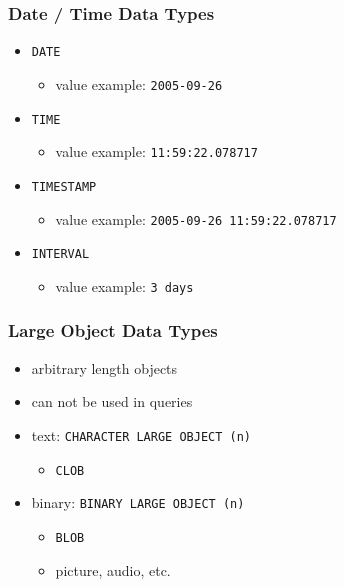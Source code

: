 \documentclass[dvipsnames]{beamer}
\theoremstyle{plain}
\begin{document}
\begin{frame}
  \frametitle{Date / Time Data Types}

  \begin{itemize}
    \item \texttt{DATE}
    \begin{itemize}
      \item value example: \texttt{2005-09-26}
    \end{itemize}

    \pause
    \medskip
    \item \texttt{TIME}
    \begin{itemize}
      \item value example: \texttt{11:59:22.078717}
    \end{itemize}

    \pause
    \medskip
    \item \texttt{TIMESTAMP}
    \begin{itemize}
      \item value example: \texttt{2005-09-26 11:59:22.078717}
    \end{itemize}

    \pause
    \medskip
    \item \texttt{INTERVAL}
    \begin{itemize}
      \item value example: \texttt{3 days}
    \end{itemize}
  \end{itemize}
\end{frame}

\begin{frame}
  \frametitle{Large Object Data Types}

  \begin{itemize}
    \item arbitrary length objects
    \item can not be used in queries

    \pause
    \bigskip
    \item text: \texttt{CHARACTER LARGE OBJECT (n)}
    \begin{itemize}
      \item \texttt{CLOB}
    \end{itemize}

    \pause
    \item binary: \texttt{BINARY LARGE OBJECT (n)}
    \begin{itemize}
      \item \texttt{BLOB}
      \item picture, audio, etc.
    \end{itemize}
  \end{itemize}
\end{frame}
\end{document}
